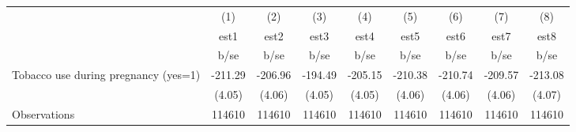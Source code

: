 {
\def\sym#1{\ifmmode^{#1}\else\(^{#1}\)\fi}
\begin{tabular}{l*{8}{c}}
\hline\hline
                                                  &\multicolumn{1}{c}{(1)}&\multicolumn{1}{c}{(2)}&\multicolumn{1}{c}{(3)}&\multicolumn{1}{c}{(4)}&\multicolumn{1}{c}{(5)}&\multicolumn{1}{c}{(6)}&\multicolumn{1}{c}{(7)}&\multicolumn{1}{c}{(8)}\\
                                                  &        est1&        est2&        est3&        est4&        est5&        est6&        est7&        est8\\
                                                  &        b/se&        b/se&        b/se&        b/se&        b/se&        b/se&        b/se&        b/se\\
\hline
Tobacco use during pregnancy (yes=1)              &     -211.29&     -206.96&     -194.49&     -205.15&     -210.38&     -210.74&     -209.57&     -213.08\\
                                                  &      (4.05)&      (4.06)&      (4.05)&      (4.05)&      (4.06)&      (4.06)&      (4.06)&      (4.07)\\
\hline
Observations                                      &      114610&      114610&      114610&      114610&      114610&      114610&      114610&      114610\\
\hline\hline
\end{tabular}
}
